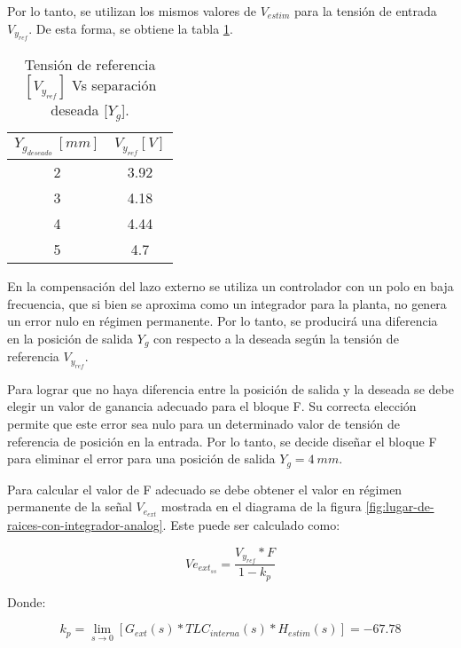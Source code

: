 Por lo tanto, se utilizan los mismos valores de $V_{estim}$ para la tensión de entrada $V_{y_{ref}}$. De esta forma, se obtiene la tabla \ref{tension-ref-vs-separacion-deseada}.

\begin{table}[H]
	\begin{center}
		\begin{tabular}{| c | c |}
			\hline
			$Y_{g_{deseado}}\:[mm]$ & $V_{y_{ref}}[V]$\\ \hline
			2 &	3.92 \\ \hline
			3 & 4.18\\ \hline
			4 & 4.44 \\ \hline
			5 & 4.7\\ \hline
		\end{tabular}
		\caption{Tensión de referencia $[V_{y_{ref}}]$ Vs separación deseada [$Y_g$].}
		\label{tension-ref-vs-separacion-deseada}
	\end{center}
\end{table}

En la compensación del lazo externo se utiliza un controlador con un polo en baja frecuencia, que si bien se aproxima como un integrador para la planta, no genera un error nulo en régimen permanente. Por lo tanto, se producirá una diferencia en la posición de salida $Y_g$ con respecto a la deseada según la tensión de referencia  $V_{y_{ref}}$. 

Para lograr que no haya diferencia entre la posición de salida y la deseada se debe elegir un valor de ganancia adecuado para el bloque F. Su correcta elección permite que este error sea nulo para un determinado valor de tensión de referencia de posición en la entrada. Por lo tanto, se decide diseñar el bloque F para eliminar el error para una posición de salida $Y_g=4\:mm$.

Para calcular el valor de F adecuado se debe obtener el valor en régimen permanente de la señal $V_{e_{ext}}$ mostrada en el diagrama de la figura \ref{fig:lugar-de-raices-con-integrador-analog}. Este puede ser calculado como:

\begin{equation} \label{eq_veext_ss}
	Ve_{ext_{ss}}=\frac{V_{y_{ref}}*F}{1-k_p}
\end{equation}

Donde: 

\begin{equation*}
	k_p=\lim\limits_{s \to 0}[G_{ext}(s)*TLC_{interna}(s)*H_{estim}(s)]=-67.78
\end{equation*}

